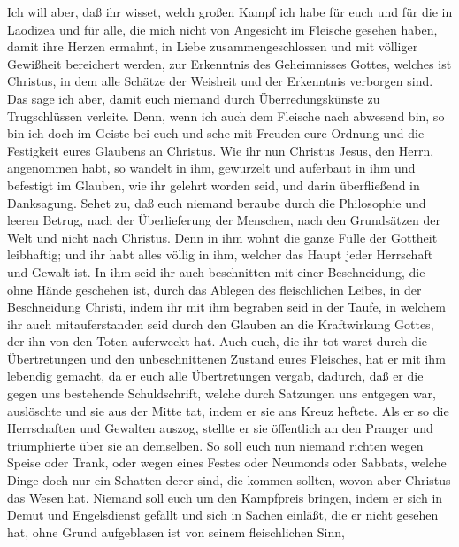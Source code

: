 Ich will aber, daß ihr wisset, welch großen Kampf ich
habe für euch und für die in Laodizea und für alle, die mich nicht von
Angesicht im Fleische gesehen haben,  damit ihre Herzen
ermahnt, in Liebe zusammengeschlossen und mit völliger Gewißheit
bereichert werden, zur Erkenntnis des Geheimnisses Gottes, welches ist
Christus,  in dem alle Schätze der Weisheit und der
Erkenntnis verborgen sind.  Das sage ich aber, damit euch
niemand durch Überredungskünste zu Trugschlüssen verleite.
 Denn, wenn ich auch dem Fleische nach abwesend bin, so
bin ich doch im Geiste bei euch und sehe mit Freuden eure Ordnung und
die Festigkeit eures Glaubens an Christus.  Wie ihr nun
Christus Jesus, den Herrn, angenommen habt, so wandelt in ihm,
 gewurzelt und auferbaut in ihm und befestigt im Glauben,
wie ihr gelehrt worden seid, und darin überfließend in Danksagung.
 Sehet zu, daß euch niemand beraube durch die Philosophie
und leeren Betrug, nach der Überlieferung der Menschen, nach den
Grundsätzen der Welt und nicht nach Christus.  Denn in ihm
wohnt die ganze Fülle der Gottheit leibhaftig;  und ihr
habt alles völlig in ihm, welcher das Haupt jeder Herrschaft und Gewalt
ist.  In ihm seid ihr auch beschnitten mit einer
Beschneidung, die ohne Hände geschehen ist, durch das Ablegen des
fleischlichen Leibes, in der Beschneidung Christi,  indem
ihr mit ihm begraben seid in der Taufe, in welchem ihr auch
mitauferstanden seid durch den Glauben an die Kraftwirkung Gottes, der
ihn von den Toten auferweckt hat.  Auch euch, die ihr tot
waret durch die Übertretungen und den unbeschnittenen Zustand eures
Fleisches, hat er mit ihm lebendig gemacht, da er euch alle
Übertretungen vergab,  dadurch, daß er die gegen uns
bestehende Schuldschrift, welche durch Satzungen uns entgegen war,
auslöschte und sie aus der Mitte tat, indem er sie ans Kreuz heftete.
 Als er so die Herrschaften und Gewalten auszog, stellte
er sie öffentlich an den Pranger und triumphierte über sie an demselben.
 So soll euch nun niemand richten wegen Speise oder
Trank, oder wegen eines Festes oder Neumonds oder Sabbats,
 welche Dinge doch nur ein Schatten derer sind, die
kommen sollten, wovon aber Christus das Wesen hat. 
Niemand soll euch um den Kampfpreis bringen, indem er sich in Demut und
Engelsdienst gefällt und sich in Sachen einläßt, die er nicht gesehen
hat, ohne Grund aufgeblasen ist von seinem fleischlichen Sinn,

